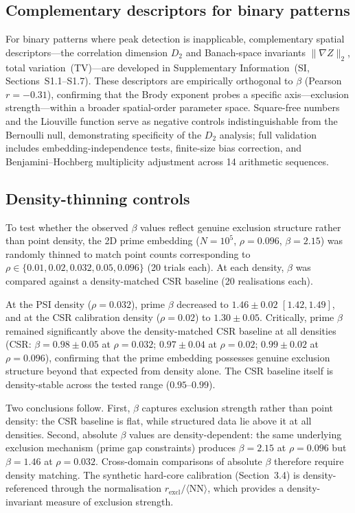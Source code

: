 \documentclass[final,1p,times]{elsarticle}
\theoremstyle{definition}
\begin{document}
\subsection{Complementary descriptors for binary patterns}

For binary patterns where peak detection is inapplicable,
complementary spatial descriptors---the correlation dimension $D_2$
and Banach-space invariants $\|\nabla Z\|_2$, total variation~(TV)---are
developed in Supplementary Information~(SI, Sections~S1.1--S1.7).
These descriptors are empirically orthogonal to $\beta$ (Pearson
$r=-0.31$), confirming that the Brody exponent probes a specific
axis---exclusion strength---within a broader spatial-order parameter
space. Square-free numbers and the Liouville function serve as negative
controls indistinguishable from the Bernoulli null, demonstrating
specificity of the $D_2$ analysis; full validation includes
embedding-independence tests, finite-size bias correction, and
Benjamini--Hochberg multiplicity adjustment across 14 arithmetic
sequences.

\subsection{Density-thinning controls}

To test whether the observed $\beta$ values reflect genuine exclusion
structure rather than point density, the 2D prime embedding
($N=10^5$, $\rho=0.096$, $\beta=2.15$) was randomly thinned to match
point counts corresponding to $\rho \in \{0.01, 0.02, 0.032, 0.05,
0.096\}$ (20 trials each). At each density, $\beta$ was compared
against a density-matched CSR baseline (20 realisations each).

At the PSI density ($\rho=0.032$), prime $\beta$ decreased to
$1.46\pm0.02$ $[1.42,1.49]$, and at the CSR calibration density
($\rho=0.02$) to $1.30\pm0.05$. Critically, prime $\beta$ remained
significantly above the density-matched CSR baseline at all densities
(CSR: $\beta=0.98\pm0.05$ at $\rho=0.032$; $0.97\pm0.04$ at
$\rho=0.02$; $0.99\pm0.02$ at $\rho=0.096$), confirming that the
prime embedding possesses genuine exclusion structure beyond that
expected from density alone. The CSR baseline itself is density-stable
across the tested range ($0.95$--$0.99$).

Two conclusions follow. First, $\beta$ captures exclusion strength
rather than point density: the CSR baseline is flat, while structured
data lie above it at all densities. Second, absolute $\beta$ values
are density-dependent: the same underlying exclusion mechanism (prime
gap constraints) produces $\beta=2.15$ at $\rho=0.096$ but
$\beta=1.46$ at $\rho=0.032$. Cross-domain comparisons of absolute
$\beta$ therefore require density matching. The synthetic hard-core
calibration (Section~3.4) is density-referenced through the
normalisation $r_{\text{excl}}/\langle\text{NN}\rangle$, which
provides a density-invariant measure of exclusion strength.
\end{document}

